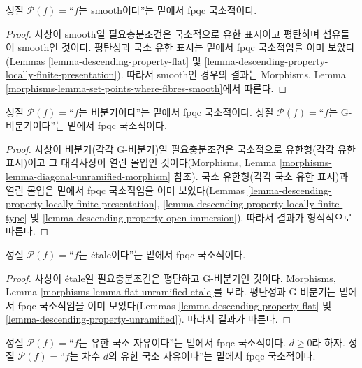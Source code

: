 \begin{lemma}
\label{lemma-descending-property-smooth}
성질 $\mathcal{P}(f) =$“$f$는 smooth이다”는 밑에서 fpqc 국소적이다.
\end{lemma}

\begin{proof}
사상이 smooth일 필요충분조건은 국소적으로 유한 표시이고 평탄하며 섬유들이
smooth인 것이다. 평탄성과 국소 유한 표시는 밑에서 fpqc 국소적임을 이미
보았다(Lemmas \ref{lemma-descending-property-flat} 및
\ref{lemma-descending-property-locally-finite-presentation}). 따라서
smooth인 경우의 결과는 Morphisms, Lemma
\ref{morphisms-lemma-set-points-where-fibres-smooth}에서 따른다.
\end{proof}

\begin{lemma}
\label{lemma-descending-property-unramified}
성질 $\mathcal{P}(f) =$“$f$는 비분기이다”는 밑에서 fpqc 국소적이다.
성질 $\mathcal{P}(f) =$“$f$는 G-비분기이다”는 밑에서 fpqc 국소적이다.
\end{lemma}

\begin{proof}
사상이 비분기(각각 G-비분기)일 필요충분조건은 국소적으로 유한형(각각 유한
표시)이고 그 대각사상이 열린 몰입인 것이다(Morphisms, Lemma
\ref{morphisms-lemma-diagonal-unramified-morphism} 참조). 국소
유한형(각각 국소 유한 표시)과 열린 몰입은 밑에서 fpqc 국소적임을 이미
보았다(Lemmas
\ref{lemma-descending-property-locally-finite-presentation},
\ref{lemma-descending-property-locally-finite-type} 및
\ref{lemma-descending-property-open-immersion}). 따라서 결과가
형식적으로 따른다.
\end{proof}

\begin{lemma}
\label{lemma-descending-property-etale}
성질 $\mathcal{P}(f) =$“$f$는 \'etale이다”는 밑에서 fpqc 국소적이다.
\end{lemma}

\begin{proof}
사상이 \'etale일 필요충분조건은 평탄하고 G-비분기인 것이다. Morphisms,
Lemma \ref{morphisms-lemma-flat-unramified-etale}를 보라. 평탄성과
G-비분기는 밑에서 fpqc 국소적임을 이미 보았다(Lemmas
\ref{lemma-descending-property-flat} 및
\ref{lemma-descending-property-unramified}). 따라서 결과가 따른다.
\end{proof}

\begin{lemma}
\label{lemma-descending-property-finite-locally-free}
성질 $\mathcal{P}(f) =$“$f$는 유한 국소 자유이다”는 밑에서 fpqc
국소적이다. $d \geq 0$라 하자. 성질
$\mathcal{P}(f) =$“$f$는 차수 $d$의 유한 국소 자유이다”는 밑에서 fpqc
국소적이다.
\end{lemma}

